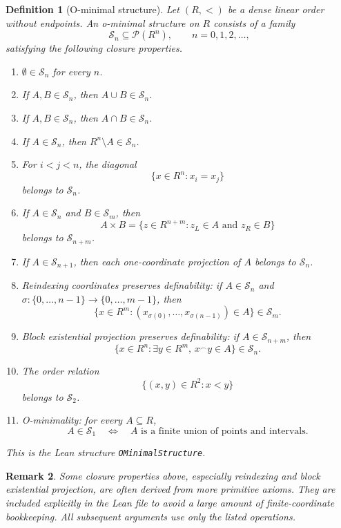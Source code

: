 \documentclass[11pt]{article}
\newtheorem{definition}{Definition}[section]
\newtheorem{remark}[definition]{Remark}
\begin{document}
\begin{definition}[O-minimal structure]
Let $(R,<)$ be a dense linear order without endpoints. An \emph{o-minimal structure} on $R$ consists of a family
\[
  \mathcal S_n\subseteq \mathcal P(R^n),
  \qquad n=0,1,2,\ldots,
\]
satisfying the following closure properties.
\begin{enumerate}[label=(\roman*)]
  \item $\emptyset\in \mathcal S_n$ for every $n$.
  \item If $A,B\in\mathcal S_n$, then $A\cup B\in\mathcal S_n$.
  \item If $A,B\in\mathcal S_n$, then $A\cap B\in\mathcal S_n$.
  \item If $A\in\mathcal S_n$, then $R^n\setminus A\in\mathcal S_n$.
  \item For $i<j<n$, the diagonal
  \[
    \{x\in R^n:x_i=x_j\}
  \]
  belongs to $\mathcal S_n$.
  \item If $A\in\mathcal S_n$ and $B\in\mathcal S_m$, then
  \[
    A\times B
    =\{z\in R^{n+m}:z_L\in A\text{ and }z_R\in B\}
  \]
  belongs to $\mathcal S_{n+m}$.
  \item If $A\in\mathcal S_{n+1}$, then each one-coordinate projection of $A$ belongs to $\mathcal S_n$.
  \item Reindexing coordinates preserves definability: if $A\in\mathcal S_n$ and
  $\sigma:\{0,\ldots,n-1\}\to\{0,\ldots,m-1\}$, then
  \[
    \{x\in R^m:(x_{\sigma(0)},\ldots,x_{\sigma(n-1)})\in A\}
    \in\mathcal S_m.
  \]
  \item Block existential projection preserves definability: if $A\in\mathcal S_{n+m}$, then
  \[
    \{x\in R^n:\exists y\in R^m,\,x\mathbin{{}^\frown}y\in A\}
    \in\mathcal S_n.
  \]
  \item The order relation
  \[
    \{(x,y)\in R^2:x<y\}
  \]
  belongs to $\mathcal S_2$.
  \item O-minimality: for every $A\subseteq R$,
  \[
    A\in\mathcal S_1
    \quad\Longleftrightarrow\quad
    A\text{ is a finite union of points and intervals.}
  \]
\end{enumerate}
This is the Lean structure \texttt{OMinimalStructure}.
\end{definition}

\begin{remark}
Some closure properties above, especially reindexing and block existential projection, are often derived from more primitive axioms. They are included explicitly in the Lean file to avoid a large amount of finite-coordinate bookkeeping. All subsequent arguments use only the listed operations.
\end{remark}
\end{document}
